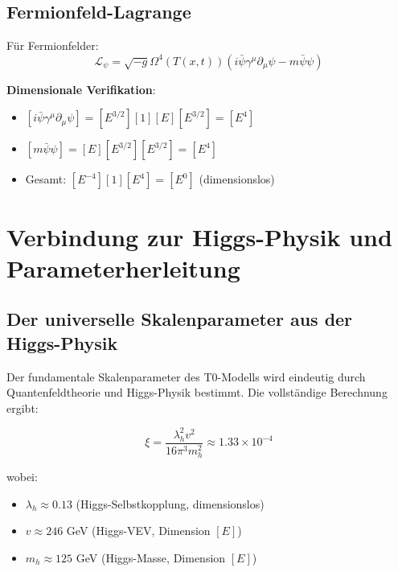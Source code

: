 \documentclass[12pt,a4paper]{article}
\newcommand{\Tfield}{T(x,t)}
\theoremstyle{definition}
\theoremstyle{remark}
\begin{document}
	\subsection{Fermionfeld-Lagrange}
	\label{subsec:fermionfeld_lagrange}
	
	Für Fermionfelder:
	\begin{equation}
		\mathcal{L}_\psi = \sqrt{-g} \Omega^4(\Tfield) \left(i\bar{\psi}\gamma^\mu\partial_\mu\psi - m\bar{\psi}\psi\right)
		\label{eq:fermion_lagrange}
	\end{equation}
	
	\textbf{Dimensionale Verifikation}:
	\begin{itemize}
		\item $[i\bar{\psi}\gamma^\mu\partial_\mu\psi] = [E^{3/2}][1][E][E^{3/2}] = [E^4]$
		\item $[m\bar{\psi}\psi] = [E][E^{3/2}][E^{3/2}] = [E^4]$
		\item Gesamt: $[E^{-4}][1][E^4] = [E^0]$ (dimensionslos) \checkmark
	\end{itemize}
	
	\section{Verbindung zur Higgs-Physik und Parameterherleitung}
	\label{sec:higgs_parameter_verbindung}
	
	\subsection{Der universelle Skalenparameter aus der Higgs-Physik}
	\label{subsec:universeller_skalenparameter}
	
	Der fundamentale Skalenparameter des T0-Modells wird eindeutig durch Quantenfeldtheorie und Higgs-Physik bestimmt. Die vollständige Berechnung ergibt:
	
	\begin{equation}
		\boxed{\xi = \frac{\lambda_h^2 v^2}{16\pi^3 m_h^2} \approx 1.33 \times 10^{-4}}
		\label{eq:xi_higgs_universal}
	\end{equation}
	
	wobei:
	\begin{itemize}
		\item $\lambda_h \approx 0.13$ (Higgs-Selbstkopplung, dimensionslos)
		\item $v \approx 246$ GeV (Higgs-VEV, Dimension $[E]$)
		\item $m_h \approx 125$ GeV (Higgs-Masse, Dimension $[E]$)
	\end{itemize}
	
\end{document}

